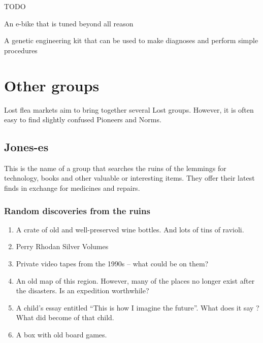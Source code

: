 \begin{npcBox}[title=Flash]
    \begin{consequences}
    \item {}
    \item {}
    \item {}
    \end{consequences}

    \begin{npcDescription}
    TODO
    \end{npcDescription}


    \begin{equipment}
    \item An e-bike that is tuned beyond all reason
    \item A genetic engineering kit that can be used to make diagnoses and perform simple procedures
    \end{equipment}
\end{npcBox}
\newpage

\chapter{Other groups}

Lost flea markets aim to bring together several Lost groups. However, it is often easy to find slightly confused Pioneers and Norms.

\section{Jones-es}

This is the name of a group that searches the ruins of the lemmings for technology, books and other valuable or interesting items. They offer their latest finds in exchange for medicines and repairs.

\subsection{Random discoveries from the ruins}

\begin{enumerate}
    \item A crate of old and well-preserved wine bottles. And lots of tins of ravioli.
    \item Perry Rhodan Silver Volumes
    \item Private video tapes from the 1990s – what could be on them?
    \item An old map of this region. However, many of the places no longer exist after the disasters. Is an expedition worthwhile?
    \item A child's essay entitled “This is how I imagine the future”. What does it say ? What did become of that child.
    \item A box with old board games.
\end{enumerate}

